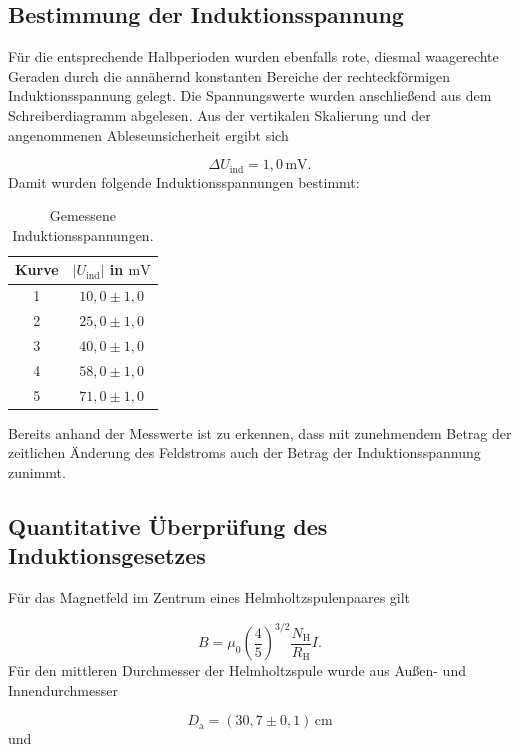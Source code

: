 \documentclass{report}
\begin{document}
\subsection{Bestimmung der Induktionsspannung}
\noindent
Für die entsprechende Halbperioden wurden ebenfalls rote, diesmal waagerechte Geraden durch die
annähernd konstanten Bereiche der rechteckförmigen Induktionsspannung gelegt.
Die Spannungswerte wurden anschließend aus dem Schreiberdiagramm abgelesen.
\noindent
Aus der vertikalen Skalierung und der angenommenen Ableseunsicherheit ergibt sich

\begin{equation}
\Delta U_{\mathrm{ind}}
=
1{,}0\,\mathrm{mV}.
\end{equation}
\noindent
Damit wurden folgende Induktionsspannungen bestimmt:

\begin{table}[htbp]
    \centering
    \caption{Gemessene Induktionsspannungen.}
    \label{tab:induktionsspannungen_tv4}
    \begin{tabular}{c|c}
        \hline
        Kurve & $|U_{\mathrm{ind}}|$ in $\mathrm{mV}$\\
        \hline
        1 & $10{,}0\pm1{,}0$\\
        2 & $25{,}0\pm1{,}0$\\
        3 & $40{,}0\pm1{,}0$\\
        4 & $58{,}0\pm1{,}0$\\
        5 & $71{,}0\pm1{,}0$\\
        \hline
    \end{tabular}
\end{table}
\noindent
Bereits anhand der Messwerte ist zu erkennen, dass mit zunehmendem Betrag der
zeitlichen Änderung des Feldstroms auch der Betrag der Induktionsspannung zunimmt.


\subsection{Quantitative Überprüfung des Induktionsgesetzes}
\noindent
Für das Magnetfeld im Zentrum eines Helmholtzspulenpaares gilt

\begin{equation}
B
=
\mu_0
\left(\frac{4}{5}\right)^{3/2}
\frac{N_{\mathrm H}}{R_{\mathrm H}}I.
\end{equation}
\noindent
Für den mittleren Durchmesser der Helmholtzspule wurde aus Außen- und
Innendurchmesser

\begin{equation}
D_{\mathrm{a}}
=
(30{,}7\pm0{,}1)\,\mathrm{cm}
\end{equation}
\noindent
und
\end{document}
